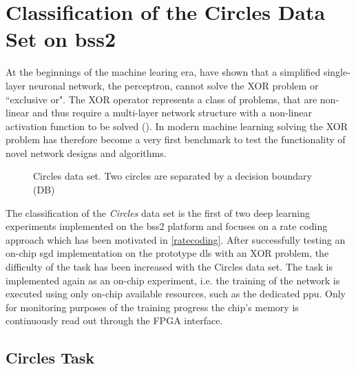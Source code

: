 \chapter{Classification of the Circles Data Set on \acrshort{bss2}}
\label{circles}
At the beginnings of the machine learing era, \citealp{perceptron} have shown that a simplified single-layer neuronal network, the perceptron, cannot solve the XOR problem or ``exclusive or". The XOR operator represents a class of problems, that are non-linear and thus require a multi-layer network structure with a non-linear activation function to be solved (\citealp{Goodfellow-et-al-2016}). In modern machine learning solving the XOR problem has therefore become a very first benchmark to test the functionality of novel network designs and algorithms.

\begin{wrapfigure}{R}{0.33\textwidth}
	\centering
	
	\caption[Circles data set.]{Circles data set. Two circles are separated by a decision boundary (DB)} 
	\label{circlestasksketch}
\end{wrapfigure}
The classification of the \emph{Circles} data set is the first of two deep learning experiments implemented on the \gls{bss2} platform and focuses on a rate coding approach which has been motivated in \cref{ratecoding}. After successfully testing an on-chip \acrlong{sgd} implementation on the prototype \gls{dls} with an XOR problem, the difficulty of the task has been increased with the Circles data set. The task is implemented again as an on-chip experiment, i.e. the training of the network is executed using only on-chip available resources, such as the dedicated \acrlong{ppu}. Only for monitoring purposes of the training progress the chip's memory is continuously read out through the FPGA interface.





\section{Circles Task}
\label{circlestask}

